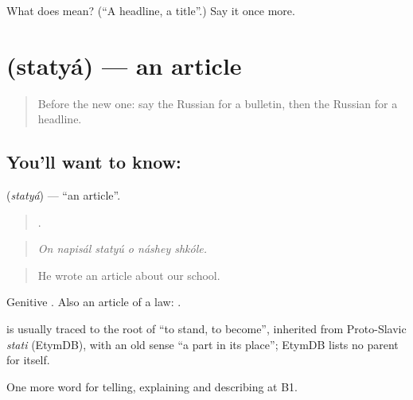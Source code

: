 \begin{tcolorbox}[breakable,colback=teal!4,colframe=teal!35!black,title={Before you move on}]
What does  mean? (\textquotedblleft{}A headline, a title\textquotedblright{}.) Say it once more.
\end{tcolorbox}
\section[\texorpdfstring{\ru{статья} (statyá)}{статья (statyá)}]{ (statyá) — an article}

\label{lesson:RU-C279-statya}



\begin{quote}
Before the new one: say the Russian for a bulletin, then the Russian for a headline.
\end{quote}

\subsection*{You'll want to know: }
\textbf{} (\emph{statyá}) — \textquotedblleft{}an article\textquotedblright{}.

\begin{quote}
     .
\end{quote}

\begin{quote}
\emph{On napisál statyú o náshey shkóle.}
\end{quote}

\begin{quote}
He wrote an article about our school.
\end{quote}

Genitive \emph{}. Also an article of a law: \emph{ }.

\begin{cousinweb}
\emph{} is usually traced to the root of \emph{} \textquotedblleft{}to stand, to become\textquotedblright{}, inherited from Proto-Slavic \emph{stati} (EtymDB), with an old sense \textquotedblleft{}a part in its place\textquotedblright{}; EtymDB lists no parent for \emph{} itself.
\end{cousinweb}

\begin{grammarlens}[title={What you've built}]
One more word for telling, explaining and describing at B1.
\end{grammarlens}

